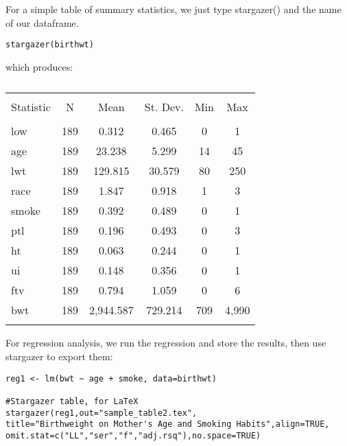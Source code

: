 \documentclass{article}
\begin{document}
For a simple table of summary statistics, we just type stargazer() and the name of our dataframe.

\begin{verbatim}
stargazer(birthwt)
\end{verbatim}
which produces:
\begin{table}[!htbp] \centering 
	\caption{} 
	\label{} 
	\begin{tabular}{@{\extracolsep{5pt}}lccccc} 
		\\[-1.8ex]\hline 
		\hline \\[-1.8ex] 
		Statistic & \multicolumn{1}{c}{N} & \multicolumn{1}{c}{Mean} & \multicolumn{1}{c}{St. Dev.} & \multicolumn{1}{c}{Min} & \multicolumn{1}{c}{Max} \\ 
		\hline \\[-1.8ex] 
		low & 189 & 0.312 & 0.465 & 0 & 1 \\ 
		age & 189 & 23.238 & 5.299 & 14 & 45 \\ 
		lwt & 189 & 129.815 & 30.579 & 80 & 250 \\ 
		race & 189 & 1.847 & 0.918 & 1 & 3 \\ 
		smoke & 189 & 0.392 & 0.489 & 0 & 1 \\ 
		ptl & 189 & 0.196 & 0.493 & 0 & 3 \\ 
		ht & 189 & 0.063 & 0.244 & 0 & 1 \\ 
		ui & 189 & 0.148 & 0.356 & 0 & 1 \\ 
		ftv & 189 & 0.794 & 1.059 & 0 & 6 \\ 
		bwt & 189 & 2,944.587 & 729.214 & 709 & 4,990 \\ 
		\hline \\[-1.8ex] 
	\end{tabular} 
\end{table} 


For regression analysis, we run the regression and store the results, then use stargazer to export them:
\begin{verbatim}
reg1 <- lm(bwt ~ age + smoke, data=birthwt)

#Stargazer table, for LaTeX
stargazer(reg1,out="sample_table2.tex",
title="Birthweight on Mother's Age and Smoking Habits",align=TRUE,
omit.stat=c("LL","ser","f","adj.rsq"),no.space=TRUE)
\end{verbatim}
\end{document}
